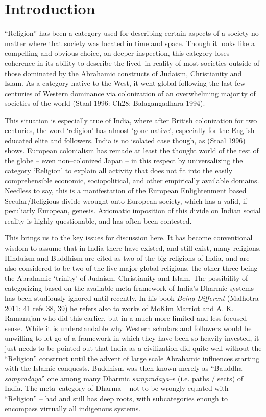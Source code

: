 \section*{Introduction}

“Religion” has been a category used for describing certain aspects of a society no matter where that society was located in time and space. Though it looks like a compelling and obvious choice, on deeper inspection, this category loses coherence in its ability to describe the lived–in reality of most societies outside of those dominated by the Abrahamic constructs of Judaism, Christianity and Islam. As a category native to the West, it went global following the last few centuries of Western dominance via colonization of an overwhelming majority of societies of the world (Staal 1996: Ch28; Balagangadhara 1994).

This situation is especially true of India, where after British colonization for two centuries, the word ‘religion’ has almost ‘gone native’, especially for the English educated elite and followers. India is no isolated case though, as (Staal 1996) shows. European colonialism has remade at least the thought world of the rest of the globe – even non–colonized Japan – in this respect by universalizing the category ‘Religion’ to explain all activity that does not fit into the easily comprehensible economic, sociopolitical, and other empirically available domains. Needless to say, this is a manifestation of the European Enlightenment based Secular/Religious divide wrought onto European society, which has a valid, if peculiarly European, genesis. Axiomatic imposition of this divide on Indian social reality is highly questionable, and has often been contested.

This brings us to the key issues for discussion here. It has become conventional wisdom to assume that in India there have existed, and still exist, many religions. Hinduism and Buddhism are cited as two of the big religions of India, and are also considered to be two of the five major global religions, the other three being the Abrahamic ‘trinity’ of Judaism, Christianity and Islam. The possibility of categorizing based on the available meta framework of India’s Dharmic systems has been studiously ignored until recently. In his book \textit{Being Different} (Malhotra 2011: 41 refs 38, 39) he refers also to works of McKim Marriot and A. K. Ramanujan who did this earlier, but in a much more limited and less focused sense. While it is understandable why Western scholars and followers would be unwilling to let go of a framework in which they have been so heavily invested, it just needs to be pointed out that India as a civilization did quite well without the “Religion” construct until the advent of large scale Abrahamic influences starting with the Islamic conquests. Buddhism was then known merely as “Bauddha \textit{saṃpradāya}” one among many Dharmic \textit{saṃpradāya}–s (i.e. paths / sects) of India. The meta–category of Dharma – not to be wrongly equated with “Religion” – had and still has deep roots, with subcategories enough to encompass virtually all indigenous systems.

